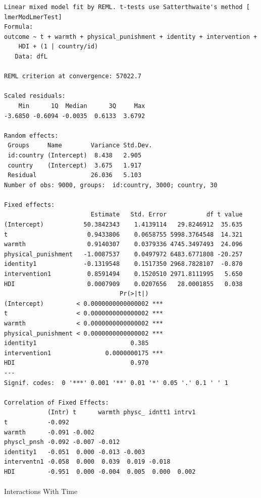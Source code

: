\documentclass[
  letterpaper,
  DIV=11,
  numbers=noendperiod]{scrreprt}
\makeatletter
\let\oldparagraph\paragraph
\renewcommand{\paragraph}{
    \@ifstar
      \xxxParagraphStar
      \xxxParagraphNoStar
  }
\newcommand{\xxxParagraphStar}[1]{\oldparagraph*{#1}\mbox{}}
\newcommand{\xxxParagraphNoStar}[1]{\oldparagraph{#1}\mbox{}}
\makeatother
\begin{document}
\begin{verbatim}
Linear mixed model fit by REML. t-tests use Satterthwaite's method [
lmerModLmerTest]
Formula: 
outcome ~ t + warmth + physical_punishment + identity + intervention +  
    HDI + (1 | country/id)
   Data: dfL

REML criterion at convergence: 57022.7

Scaled residuals: 
    Min      1Q  Median      3Q     Max 
-3.6850 -0.6094 -0.0035  0.6133  3.6792 

Random effects:
 Groups     Name        Variance Std.Dev.
 id:country (Intercept)  8.438   2.905   
 country    (Intercept)  3.675   1.917   
 Residual               26.036   5.103   
Number of obs: 9000, groups:  id:country, 3000; country, 30

Fixed effects:
                        Estimate   Std. Error           df t value
(Intercept)           50.3842343    1.4139114   29.8246912  35.635
t                      0.9433806    0.0658755 5998.3764548  14.321
warmth                 0.9140307    0.0379336 4745.3497493  24.096
physical_punishment   -1.0087537    0.0497972 6483.6771808 -20.257
identity1             -0.1319548    0.1517350 2968.7828107  -0.870
intervention1          0.8591494    0.1520510 2971.8111995   5.650
HDI                    0.0007909    0.0207656   28.0001855   0.038
                                Pr(>|t|)    
(Intercept)         < 0.0000000000000002 ***
t                   < 0.0000000000000002 ***
warmth              < 0.0000000000000002 ***
physical_punishment < 0.0000000000000002 ***
identity1                          0.385    
intervention1               0.0000000175 ***
HDI                                0.970    
---
Signif. codes:  0 '***' 0.001 '**' 0.01 '*' 0.05 '.' 0.1 ' ' 1

Correlation of Fixed Effects:
            (Intr) t      warmth physc_ idntt1 intrv1
t           -0.092                                   
warmth      -0.091 -0.002                            
physcl_pnsh -0.092 -0.007 -0.012                     
identity1   -0.051  0.000 -0.013 -0.003              
interventn1 -0.058  0.000  0.039  0.019 -0.018       
HDI         -0.951  0.000 -0.004  0.005  0.000  0.002
\end{verbatim}

\paragraph{Interactions With Time}\label{interactions-with-time-1}
\end{document}
